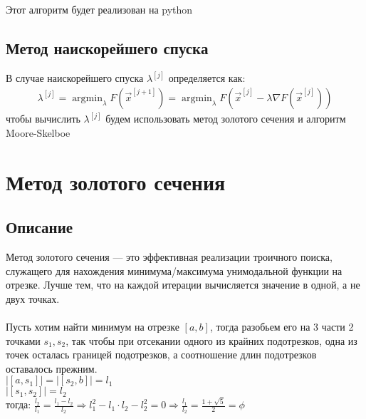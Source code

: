 \documentclass{article}
\begin{document}
    Этот алгоритм будет реализован на python

    \subsection{Метод наискорейшего спуска}
    В случае наискорейшего спуска $\lambda^{[j]}$ определяется как:\\
    \begin{gather*}
        \lambda^{[j]}=\operatorname{argmin}_\lambda F\left(\vec{x}^{[j+1]}\right)=\operatorname{argmin}_\lambda F\left(\vec{x}^{[j]}-\lambda \nabla F\left(\vec{x}^{[j]}\right)\right)
    \end{gather*}
    чтобы вычислить $\lambda^{[j]}$ будем использовать метод золотого сечения и алгоритм Moore-Skelboe










































    \newpage



    \section{Метод золотого сечения}

    \subsection{Описание}

    Метод золотого сечения — это эффективная реализации троичного поиска, служащего для нахождения минимума/максимума унимодальной функции на отрезке. Лучше тем, что на каждой итерации вычисляется значение в одной, а не двух точках.\\\\
    Пусть хотим найти минимум на отрезке $[a, b]$, тогда разобьем его на 3 части 2 точками $s_1, s_2$, так чтобы при отсекании одного из крайних подотрезков, одна из точек осталась границей подотрезков, а соотношение длин подотрезков оставалось прежним.\\
    $|[a, s_1]|=|[s_2, b]|=l_1$\\
    $|[s_1, s_2]|=l_2$\\
    тогда: $\frac{l_2}{l_1}=\frac{l_1-l_2}{l_2} \Rightarrow l_1^2-l_1\cdot{l_2}-l_2^2=0 \Rightarrow \frac{l_1}{l_2}=\frac{1+\sqrt{5}}{2}=\phi$
\end{document}
